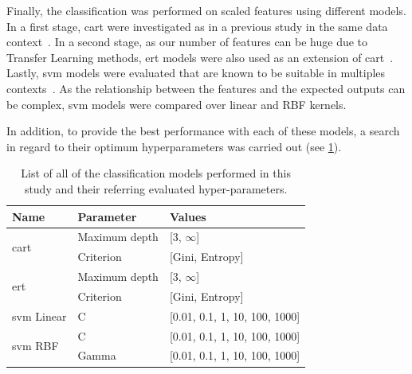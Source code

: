 \documentclass[journal,article,submit,moreauthors,pdftex, applsci]{Definitions/mdpi}
\begin{document}
Finally, the classification was performed on scaled features using different models. In a first stage, \ac{cart} were investigated as in a previous study in the same data context~\cite{Wiltgen2008}. In a second stage, as our number of features can be huge due to Transfer Learning methods, \ac{ert} models were also used as an extension of \ac{cart}~\cite{Geurts2006}. Lastly, \ac{svm} models were evaluated that are known to be suitable in multiples contexts~\cite{Smach2008a,Kose2016b}. As the relationship between the features and the expected outputs can be complex, \ac{svm} models were compared over linear and RBF kernels.\par
In addition, to provide the best performance with each of these models, a search in regard to their optimum hyperparameters was carried out (see \cref{tab:image_hyperparameters}).\par
\begin{table}[]
    \centering
    \begin{tabular}{lll}
    \textbf{Name}                   & \textbf{Parameter}& \textbf{Values}               \\ \hline
    \multirow{2}{*}{\ac{cart}}      & Maximum depth     & [3, $\infty$]                 \\ \cline{2-3}
                                    & Criterion         & [Gini, Entropy]               \\ \hline 
    \multirow{2}{*}{\ac{ert}}       & Maximum depth     & [3, $\infty$]                 \\ \cline{2-3}
                                    & Criterion         & [Gini, Entropy]               \\ \hline 
    \ac{svm} Linear                 & C                 & [0.01, 0.1, 1, 10, 100, 1000] \\ \hline
    \multirow{2}{*}{\ac{svm} RBF}   & C                 & [0.01, 0.1, 1, 10, 100, 1000] \\ \cline{2-3}
                                    & Gamma             & [0.01, 0.1, 1, 10, 100, 1000] \\ \hline 
    \end{tabular}    
    \caption{List of all of the classification models performed in this study and their referring evaluated hyper-parameters.}
    \label{tab:image_hyperparameters}
\end{table}\par


\end{document}
